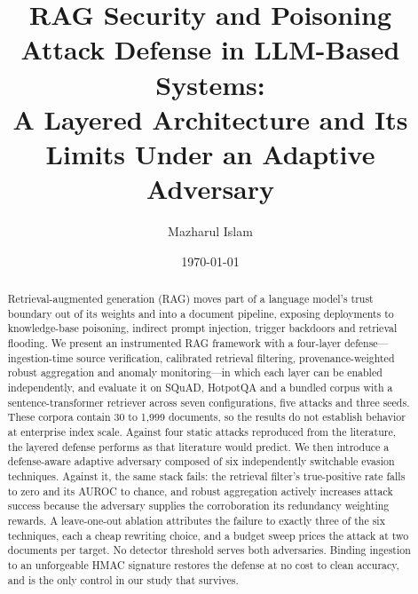 \documentclass[10pt,a4paper]{article}
\title{RAG Security and Poisoning Attack Defense in LLM-Based Systems:\\
A Layered Architecture and Its Limits Under an Adaptive Adversary}
\author{Mazharul Islam}
\date{\today}
\begin{document}
\maketitle

\begin{abstract}
Retrieval-augmented generation (RAG) moves part of a language model's trust boundary out of its
weights and into a document pipeline, exposing deployments to knowledge-base poisoning,
indirect prompt injection, trigger backdoors and retrieval flooding. We present an instrumented
RAG framework with a four-layer defense---ingestion-time source verification, calibrated
retrieval filtering, provenance-weighted robust aggregation and anomaly monitoring---in which
each layer can be enabled independently, and evaluate it on SQuAD, HotpotQA and a bundled
corpus with a sentence-transformer retriever across seven configurations, five attacks and
three seeds. These corpora contain 30 to 1,999 documents, so the results do not establish
behavior at enterprise index scale. Against four static attacks reproduced from the literature, the layered defense
performs as that literature would predict. We then introduce a defense-aware adaptive adversary
composed of six independently switchable evasion techniques. Against it, the same stack fails:
the retrieval filter's true-positive rate falls to zero and its AUROC to chance, and robust
aggregation actively increases attack success because the adversary supplies the corroboration
its redundancy weighting rewards. A leave-one-out ablation attributes the failure to exactly
three of the six techniques, each a cheap rewriting choice, and a budget sweep prices the attack
at two documents per target. No detector threshold serves both adversaries. Binding ingestion to
an unforgeable HMAC signature restores the defense at no cost to clean accuracy, and is the only
control in our study that survives.
\end{abstract}





\end{document}
